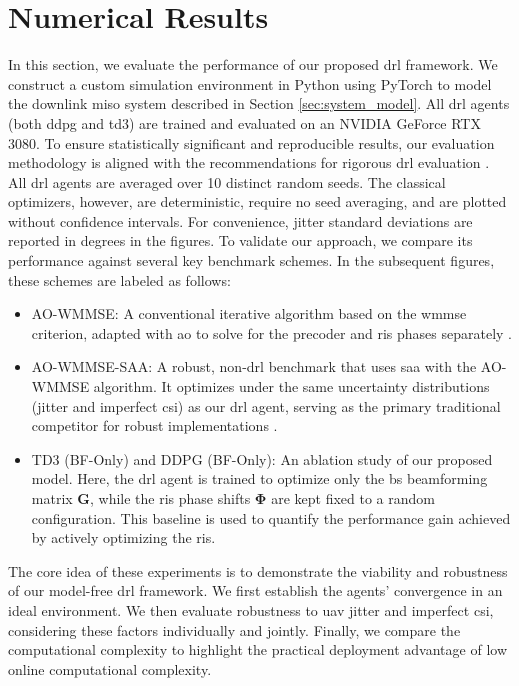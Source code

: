 \section{Numerical Results}
\label{sec:results}
In this section, we evaluate the performance of our proposed \gls{drl} framework. We construct a custom simulation environment in Python using PyTorch to model the downlink \gls{miso} system described in Section \ref{sec:system_model}. All \gls{drl} agents (both \gls{ddpg} and \gls{td3}) are trained and evaluated on an NVIDIA GeForce RTX 3080. To ensure statistically significant and reproducible results, our evaluation methodology is aligned with the recommendations for rigorous \gls{drl} evaluation \cite{henderson2018deep}. All \gls{drl} agents are averaged over 10 distinct random seeds. The classical optimizers, however, are deterministic, require no seed averaging, and are plotted without confidence intervals. For convenience, jitter standard deviations are reported in degrees in the figures.
\noindent To validate our approach, we compare its performance against several key benchmark schemes. In the subsequent figures, these schemes are labeled as follows:
\begin{itemize}
    \item AO-WMMSE: A conventional iterative algorithm based on the \gls{wmmse} criterion, adapted with \gls{ao} to solve for the precoder and \gls{ris} phases separately \cite{shi2011iteratively}.
    \item AO-WMMSE-SAA: A robust, non-\gls{drl} benchmark that uses \gls{saa} with the AO-WMMSE algorithm. It optimizes under the same uncertainty distributions (jitter and imperfect \gls{csi}) as our \gls{drl} agent, serving as the primary traditional competitor for robust implementations \cite{Kim2011SAA}.
    \item TD3 (BF-Only) and DDPG (BF-Only): An ablation study of our proposed model. Here, the \gls{drl} agent is trained to optimize only the \gls{bs} beamforming matrix $\mathbf{G}$, while the \gls{ris} phase shifts $\boldsymbol{\Phi}$ are kept fixed to a random configuration. This baseline is used to quantify the performance gain achieved by actively optimizing the \gls{ris}.
\end{itemize}

\noindent The core idea of these experiments is to demonstrate the viability and robustness of our model-free \gls{drl} framework. We first establish the agents' convergence in an ideal environment. We then evaluate robustness to \gls{uav} jitter and imperfect \gls{csi}, considering these factors individually and jointly. Finally, we compare the computational complexity to highlight the practical deployment advantage of low online computational complexity.
